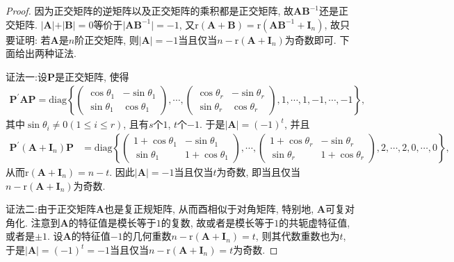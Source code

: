 \documentclass[../../main.tex]{subfiles}%
\begin{document}
\begin{proof}

因为正交矩阵的逆矩阵以及正交矩阵的乘积都是正交矩阵, 故\(\boldsymbol{AB}^{-1}\)还是正交矩阵. \(\vert\boldsymbol{A}\vert+\vert\boldsymbol{B}\vert = 0\)等价于\(\vert\boldsymbol{AB}^{-1}\vert = -1\), 又\(\mathrm{r}(\boldsymbol{A}+\boldsymbol{B})=\mathrm{r}(\boldsymbol{AB}^{-1}+\boldsymbol{I}_{n})\), 故只要证明: 若\(\boldsymbol{A}\)是\(n\)阶正交矩阵, 则\(\vert\boldsymbol{A}\vert = -1\)当且仅当\(n-\mathrm{r}(\boldsymbol{A}+\boldsymbol{I}_{n})\)为奇数即可. 下面给出两种证法.

{\color{blue}证法一:}设\(\boldsymbol{P}\)是正交矩阵, 使得
\begin{align*}
\boldsymbol{P}^{\prime}\boldsymbol{AP}=\mathrm{diag}\left\{\begin{pmatrix}\cos\theta_{1}&-\sin\theta_{1}\\\sin\theta_{1}&\cos\theta_{1}\end{pmatrix},\cdots,\begin{pmatrix}\cos\theta_{r}&-\sin\theta_{r}\\\sin\theta_{r}&\cos\theta_{r}\end{pmatrix},1,\cdots,1, -1,\cdots,-1\right\},
\end{align*}
其中\(\sin\theta_{i}\neq 0(1\leqslant  i\leqslant  r)\), 且有\(s\)个\(1\), \(t\)个\(-1\). 于是\(\vert\boldsymbol{A}\vert = (-1)^{t}\), 并且
\begin{align*}
\boldsymbol{P}^{\prime}(\boldsymbol{A}+\boldsymbol{I}_{n})\boldsymbol{P}&=\mathrm{diag}\left\{\begin{pmatrix}1 + \cos\theta_{1}&-\sin\theta_{1}\\\sin\theta_{1}&1 + \cos\theta_{1}\end{pmatrix},\cdots,\begin{pmatrix}1 + \cos\theta_{r}&-\sin\theta_{r}\\\sin\theta_{r}&1 + \cos\theta_{r}\end{pmatrix},2,\cdots,2,0,\cdots,0\right\},
\end{align*}
从而\(\mathrm{r}(\boldsymbol{A}+\boldsymbol{I}_{n}) = n - t\). 因此\(\vert\boldsymbol{A}\vert = -1\)当且仅当\(t\)为奇数, 即当且仅当\(n-\mathrm{r}(\boldsymbol{A}+\boldsymbol{I}_{n})\)为奇数.

{\color{blue}证法二:}由于正交矩阵\(\boldsymbol{A}\)也是复正规矩阵, 从而酉相似于对角矩阵, 特别地, \(\boldsymbol{A}\)可复对角化. 注意到\(\boldsymbol{A}\)的特征值是模长等于\(1\)的复数, 故或者是模长等于\(1\)的共轭虚特征值, 或者是\(\pm1\). 设\(\boldsymbol{A}\)的特征值\(-1\)的几何重数\(n-\mathrm{r}(\boldsymbol{A}+\boldsymbol{I}_{n}) = t\), 则其代数重数也为\(t\), 于是\(\vert\boldsymbol{A}\vert = (-1)^{t} = -1\)当且仅当\(n-\mathrm{r}(\boldsymbol{A}+\boldsymbol{I}_{n}) = t\)为奇数.


\end{proof}
\end{document}
